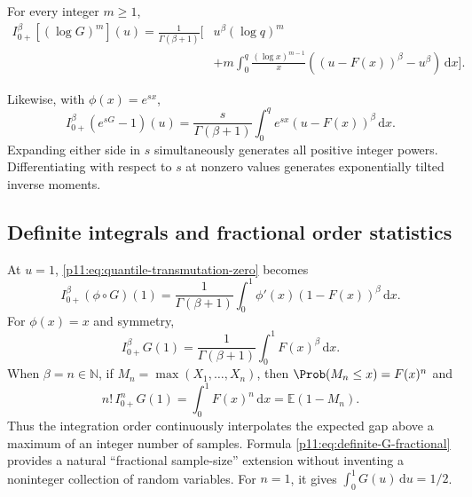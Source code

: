 \documentclass[11pt,oneside]{article}
\theoremstyle{definition}
\theoremstyle{remark}
\newcommand{\E}{\mathbb E}
\newcommand{\N}{\mathbb N}
\newcommand{\dd}{\,\mathrm d}
\newcommand{\1}{\mathbf 1}
\begin{document}
\begin{corollary}
For every integer $m\ge1$,
\begin{align}
 I_{0+}^{\beta}\!\left[(\log G)^m\right](u)
 =\frac1{\Gamma(\beta+1)}\Bigg[
 &u^\beta(\log q)^m\\
 &+m\int_0^q\frac{(\log x)^{m-1}}x
 \left((u-F(x))^\beta-u^\beta\right)\dd x
 \Bigg].
 \label{p11:eq:log-power-transmutation}
\end{align}
\end{corollary}

Likewise, with $\phi(x)=e^{sx}$,
\begin{equation}
 I_{0+}^{\beta}\!\left(e^{sG}-1\right)(u)
 =\frac{s}{\Gamma(\beta+1)}
  \int_0^q e^{sx}(u-F(x))^\beta\dd x.
 \label{p11:eq:exp-quantile-transmutation}
\end{equation}
Expanding either side in $s$ simultaneously generates all positive integer
powers.  Differentiating with respect to $s$ at nonzero values generates
exponentially tilted inverse moments.

\subsection{Definite integrals and fractional order statistics}

At $u=1$, \eqref{p11:eq:quantile-transmutation-zero} becomes
\begin{equation}
 I_{0+}^{\beta}(\phi\circ G)(1)
 =\frac1{\Gamma(\beta+1)}
  \int_0^1\phi'(x)(1-F(x))^\beta\dd x.
 \label{p11:eq:definite-quantile-general}
\end{equation}
For $\phi(x)=x$ and symmetry,
\begin{equation}
 I_{0+}^{\beta}G(1)
 =\frac1{\Gamma(\beta+1)}\int_0^1F(x)^\beta\dd x.
 \label{p11:eq:definite-G-fractional}
\end{equation}
When $\beta=n\in\N$, if $M_n=\max(X_1,\ldots,X_n)$, then
$\Prob(M_n\le x)=F(x)^n$ and
\begin{equation}
 n!\,I_{0+}^{n}G(1)
 =\int_0^1F(x)^n\dd x
 =\E(1-M_n).
 \label{p11:eq:order-statistic-interpretation}
\end{equation}
Thus the integration order continuously interpolates the expected gap above
a maximum of an integer number of samples.  Formula
\eqref{p11:eq:definite-G-fractional} provides a natural ``fractional sample-size''
extension without inventing a noninteger collection of random variables.
For $n=1$, it gives $\int_0^1G(u)\dd u=1/2$.
\end{document}
